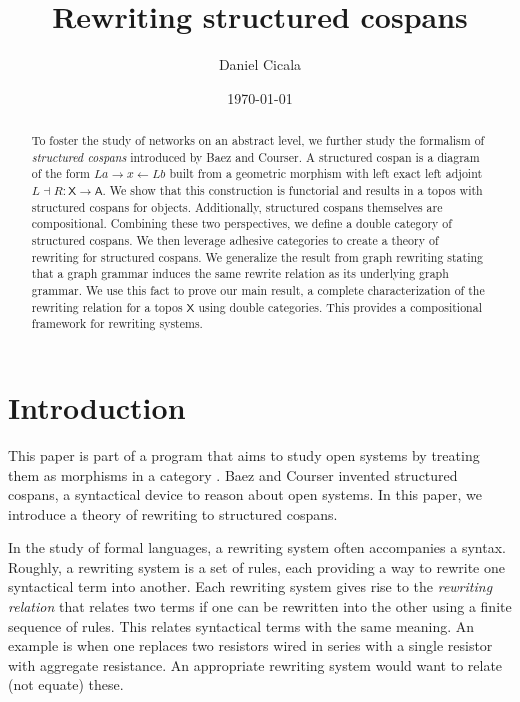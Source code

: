 \documentclass{amsart}
\newcommand{\A}{\cat{A}}
\newcommand{\X}{\cat{X}}
\newcommand{\cat}[1]{\mathsf{#1}}
\newcommand{\from}{\colon}
\renewcommand{\gets}{\leftarrow}
\theoremstyle{remark}
\theoremstyle{definition}
\begin{document}
\author{Daniel Cicala}
\title{Rewriting structured cospans}
\date{\today}
\address{Department of Mathematics\\
  University of California, Riverside\\
  Riverside, California 92521}
\maketitle

\begin{abstract}
  To foster the study of networks on an abstract level, we
  further study the formalism of \emph{structured cospans}
  introduced by Baez and Courser. A structured cospan is a
  diagram of the form $ La \to x \gets Lb $ built from a
  geometric morphism with left exact left adjoint
  $ L \dashv R \from \X \to \A $.  We show that this
  construction is functorial and results in a topos with
  structured cospans for objects.  Additionally, structured
  cospans themselves are compositional. Combining these two
  perspectives, we define a double category of structured
  cospans.  We then leverage adhesive categories to create a
  theory of rewriting for structured cospans. We generalize
  the result from graph rewriting stating that a graph
  grammar induces the same rewrite relation as its
  underlying graph grammar.  We use this fact to prove our
  main result, a complete characterization of the rewriting
  relation for a topos $ \X $ using double categories.  This
  provides a compositional framework for rewriting systems.
\end{abstract}


\section{Introduction}
\label{sec:Introduction}

This paper is part of a program that aims to study open
systems by treating them as morphisms in a category
\cite{PassiveNets,MrkvProc,RxNets,OpenPetri,Cic_SpCsp}. Baez
and Courser invented structured cospans, a syntactical
device to reason about open systems. In this paper, we
introduce a theory of rewriting to structured cospans.

In the study of formal languages, a rewriting system often
accompanies a syntax.  Roughly, a rewriting system is a set
of rules, each providing a way to rewrite one syntactical
term into another.  Each rewriting system gives rise to the
\emph{rewriting relation} that relates two terms if one can
be rewritten into the other using a finite sequence of
rules. This relates syntactical terms with the same meaning.
An example is when one replaces two resistors wired in
series with a single resistor with aggregate resistance.  An
appropriate rewriting system would want to relate (not
equate) these.
\end{document}

